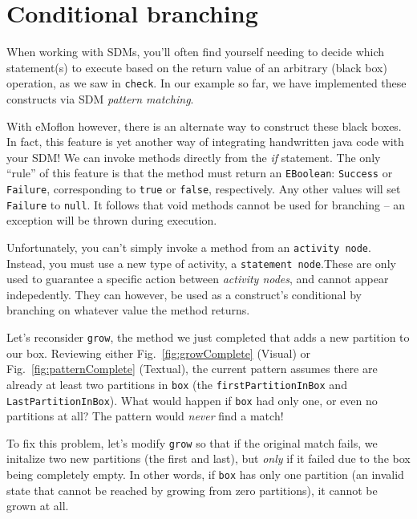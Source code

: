 \newpage
\hypertarget{sec:conBran}{}
\section{Conditional branching}
\genHeader

When working with SDMs, you'll often find yourself needing to decide which statement(s) to execute based on the return value of an arbitrary (black box)
operation, as we saw in \texttt{check}. In our example so far, we have implemented these constructs via SDM \emph{pattern matching}. 

With eMoflon however, there is an alternate way to construct these black boxes. In fact, this feature is yet another way of integrating handwritten java code
with your SDM! We can invoke methods directly from the \emph{if} statement. The only ``rule'' of this feature is that the method must return an
\texttt{EBoolean}: \texttt{Success} or \texttt{Failure}, corresponding to \texttt{true} or \texttt{false}, respectively. Any other values will set
\texttt{Failure} to \texttt{null}. It follows that void methods cannot be used for branching -- an exception will be thrown during execution.

Unfortunately, you can't simply invoke a method from an \texttt{activity node}. Instead, you must use a new type of activity, a \texttt{statement
node}.These are only used to guarantee a specific action between \emph{activity nodes}, and cannot appear indepedently. They can however,
be used as a construct's conditional by branching on whatever value the method returns.

Let's reconsider \texttt{grow}, the method we just completed that adds a new partition to our box. Reviewing either Fig.~\ref{fig:growComplete} (Visual) or
Fig.~\ref{fig:patternComplete} (Textual), the current pattern assumes there are already at least two partitions in \texttt{box} (the
\texttt{firstPartitionInBox} and \texttt{LastPartitionInBox}). What would happen if \texttt{box} had only one, or even no partitions at all? The pattern would
\emph{never} find a match!

To fix this problem, let's modify \texttt{grow} so that if the original match fails, we initalize two new partitions (the first and last), but \emph{only} if it
failed due to the box being completely empty. In other words, if \texttt{box} has only one partition (an invalid state that cannot be reached by
growing from zero partitions), it cannot be grown at all.







